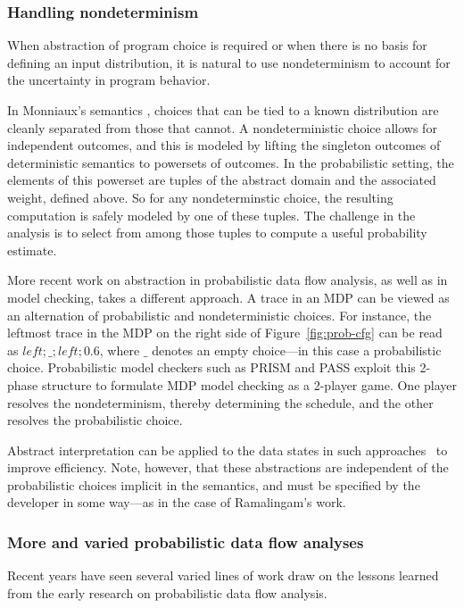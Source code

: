 \subsubsection{Handling nondeterminism}
When abstraction of program choice is required or when 
there is no basis for defining an input distribution,
it is natural to use nondeterminism to account for the uncertainty
in program behavior.

In Monniaux's semantics \cite{monniaux2005abstract}, choices that can be tied to a known
distribution are cleanly separated from those that cannot.
A nondeterministic choice allows for independent outcomes, and
this is modeled by lifting the singleton outcomes of deterministic
semantics to powersets of outcomes.
In the probabilistic setting, the elements of this powerset are
tuples of the abstract domain and the associated weight, defined
above.  So for any nondeterminstic choice, the resulting computation 
is safely modeled by one of these tuples.  The challenge in the
analysis is to select from among those tuples to compute a useful
probability estimate.

More recent work on abstraction in probabilistic data flow
analysis, as well as in model checking, takes a different approach.
A trace in an MDP can be viewed as an alternation of
probabilistic and nondeterministic choices.  For instance, the
leftmost trace in the MDP on the right side of Figure~\ref{fig:prob-cfg}
can be read as $\mathit{left};\_;\mathit{left};0.6$, where $\_$ 
denotes an empty choice---in this case a probabilistic choice.
Probabilistic model checkers such as PRISM and PASS exploit this
2-phase structure to formulate MDP model checking as a 2-player
game.  One player resolves the nondeterminism, thereby determining
the schedule, and the other resolves the probabilistic choice.

Abstract interpretation can be applied to the data states in
such approaches~\cite{kwiatkowska2011prism,wachter2010best,esparza2011probabilistic}
to improve efficiency.  Note, however, that these abstractions are
independent of the probabilistic choices implicit in the semantics, and must be specified
by the developer in some way---as in the case of Ramalingam's work.

\subsubsection{More and varied probabilistic data flow analyses}
Recent years have seen several varied lines of work draw on
the lessons learned from the early research on probabilistic
data flow analysis.

